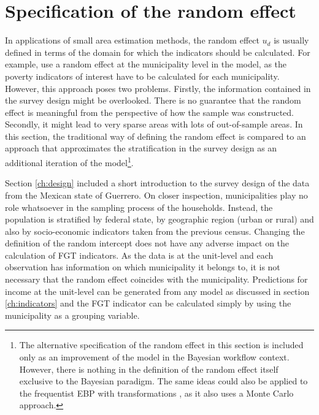 \section{Specification of the random effect}
\label{ch:raneff}
In applications of small area estimation methods, the random effect $u_d$ is usually defined in terms of the domain for which the indicators should be calculated.
For example, \cite{rojas_perilla_data_2020} use a random effect at the municipality level in the model, as the poverty indicators of interest have to be calculated for each municipality.
However, this approach poses two problems.
Firstly, the information contained in the survey design might be overlooked.
There is no guarantee that the random effect is meaningful from the perspective of how the sample was constructed.
Secondly, it might lead to very sparse areas with lots of out-of-sample areas.
In this section, the traditional way of defining the random effect is compared to an approach that approximates the stratification in the survey design as an additional iteration of the model\footnote{The alternative specification of the random effect in this section is included only as an improvement of the model in the Bayesian workflow context. However, there is nothing in the definition of the random effect itself exclusive to  the Bayesian paradigm. The same ideas could also be applied to the frequentist EBP with transformations \citep{rojas_perilla_data_2020}, as it also uses a Monte Carlo approach.}.

Section \ref{ch:design} included a short introduction to the survey design of the data from the Mexican state of Guerrero.
On closer inspection, municipalities play no role whatsoever in the sampling process of the households.
Instead, the population is stratified by federal state, by geographic region (urban or rural) and also by socio-economic indicators taken from the previous census.
Changing the definition of the random intercept does not have any adverse impact on the calculation of FGT indicators.
As the data is at the unit-level and each observation has information on which municipality it belongs to, it is not necessary that the random effect coincides with the municipality.
Predictions for income at the unit-level can be generated from any model as discussed in section \ref{ch:indicators} and the FGT indicator can be calculated simply by using the municipality as a grouping variable.

